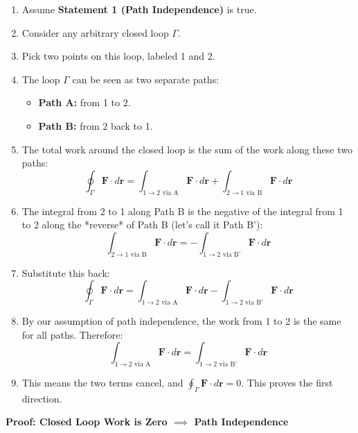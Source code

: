\documentclass[11pt, a4paper]{article} %
\begin{document}
\begin{enumerate}
    \item Assume \textbf{Statement 1 (Path Independence)} is true.
    \item Consider any arbitrary closed loop $\Gamma$.
    \item Pick two points on this loop, labeled 1 and 2.
    \item The loop $\Gamma$ can be seen as two separate paths:
    \begin{itemize}
        \item \textbf{Path A:} from 1 to 2.
        \item \textbf{Path B:} from 2 back to 1.
    \end{itemize}
    \item The total work around the closed loop is the sum of the work along these two paths:
    $$\oint_\Gamma \mathbf{F} \cdot d \mathbf{r} = \int_{1 \to 2 \text{ via A}} \mathbf{F} \cdot d \mathbf{r} + \int_{2 \to 1 \text{ via B}} \mathbf{F} \cdot d \mathbf{r}$$
    \item The integral from 2 to 1 along Path B is the negative of the integral from 1 to 2 along the *reverse* of Path B (let's call it Path B'):
    $$\int_{2 \to 1 \text{ via B}} \mathbf{F} \cdot d \mathbf{r} = - \int_{1 \to 2 \text{ via B'}} \mathbf{F} \cdot d \mathbf{r}$$
    \item Substitute this back:
    $$\oint_\Gamma \mathbf{F} \cdot d \mathbf{r} = \int_{1 \to 2 \text{ via A}} \mathbf{F} \cdot d \mathbf{r} - \int_{1 \to 2 \text{ via B'}} \mathbf{F} \cdot d \mathbf{r}$$
    \item By our assumption of path independence, the work from 1 to 2 is the same for all paths. Therefore:
    $$\int_{1 \to 2 \text{ via A}} \mathbf{F} \cdot d \mathbf{r} = \int_{1 \to 2 \text{ via B'}} \mathbf{F} \cdot d \mathbf{r}$$
    \item This means the two terms cancel, and $\oint_\Gamma \mathbf{F} \cdot d \mathbf{r} = 0$. This proves the first direction.
\end{enumerate}

\textbf{Proof: Closed Loop Work is Zero $\implies$ Path Independence}
\end{document}
